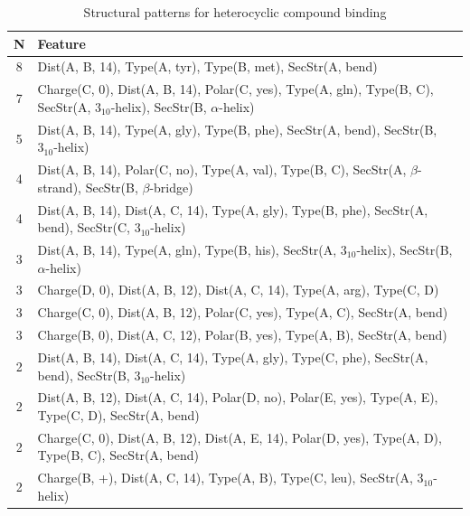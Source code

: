 \documentclass[11pt,twoside,a4paper]{book}
\begin{document}
\begin{table}\begin{tabularx}{\textwidth}{cX}\textbf{N} & \textbf{Feature} \\ \hline  
8 & Dist(A, B, 14),  Type(A, tyr), Type(B, met), SecStr(A, bend)\\ \hline 
7 & Charge(C, 0), Dist(A, B, 14), Polar(C, yes),  Type(A, gln), Type(B, C), \newline SecStr(A, $3_{10}$-helix), SecStr(B, $\alpha$-helix)\\ \hline 
5 & Dist(A, B, 14),  Type(A, gly), Type(B, phe), SecStr(A, bend), SecStr(B, $3_{10}$-helix)\\ \hline 
4 & Dist(A, B, 14), Polar(C, no),  Type(A, val), Type(B, C), SecStr(A, $\beta$-strand), \newline SecStr(B, $\beta$-bridge)\\ \hline 
4 & Dist(A, B, 14), Dist(A, C, 14),  Type(A, gly), Type(B, phe), SecStr(A, bend), \newline SecStr(C, $3_{10}$-helix)\\ \hline 
3 & Dist(A, B, 14),  Type(A, gln), Type(B, his), SecStr(A, $3_{10}$-helix), SecStr(B, $\alpha$-helix)\\ \hline 
3 & Charge(D, 0), Dist(A, B, 12), Dist(A, C, 14),   Type(A, arg), Type(C, D)\\ \hline 
3 & Charge(C, 0), Dist(A, B, 12), Polar(C, yes),   Type(A, C), SecStr(A, bend)\\ \hline 
3 & Charge(B, 0), Dist(A, C, 12), Polar(B, yes),   Type(A, B), SecStr(A, bend)\\ \hline 
2 & Dist(A, B, 14), Dist(A, C, 14),  Type(A, gly), Type(C, phe), SecStr(A, bend), \newline SecStr(B, $3_{10}$-helix)\\ \hline 
2 & Dist(A, B, 12), Dist(A, C, 14), Polar(D, no), Polar(E, yes),   Type(A, E), Type(C, D), SecStr(A, bend)\\ \hline 
2 & Charge(C, 0), Dist(A, B, 12), Dist(A, E, 14), Polar(D, yes),   Type(A, D), \newline Type(B, C), SecStr(A, bend)\\ \hline 
2 & Charge(B, +), Dist(A, C, 14),  Type(A, B), Type(C, leu), SecStr(A, $3_{10}$-helix)\\ \hline 
 \end{tabularx}\caption{Structural patterns for heterocyclic compound binding}\label{tab:heterocyclic_compound_binding}\end{table}
\end{document}
